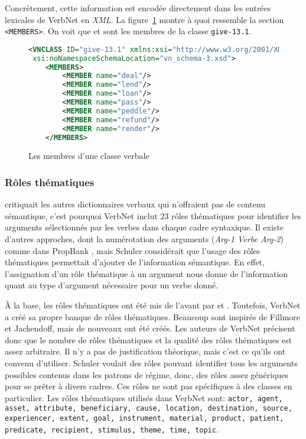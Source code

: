 Concrètement, cette information est encodée directement dans les entrées lexicales de VerbNet en \emph{XML}. La figure~\ref{membre} montre à quoi ressemble la section \texttt{<MEMBERS>}. On voit que  et  sont les membres de la classe \texttt{give-13.1}.

\begin{figure}[htb]
  \caption{Les membres d'une classe verbale}
	\label{membre}
\begin{lstlisting}[language=XML]
<VNCLASS ID="give-13.1" xmlns:xsi="http://www.w3.org/2001/XMLSchema-instance"
 xsi:noNamespaceSchemaLocation="vn_schema-3.xsd">
    <MEMBERS>
        <MEMBER name="deal"/>
        <MEMBER name="lend"/>
        <MEMBER name="loan"/>
        <MEMBER name="pass"/>
        <MEMBER name="peddle"/>
        <MEMBER name="refund"/>
        <MEMBER name="render"/>
    </MEMBERS>
\end{lstlisting}
\end{figure}

\subsubsection{Rôles thématiques}
\cite{SchulerVerbnetBroadcoverageComprehensive2005} critiquait les autres dictionnaires verbaux qui n'offraient pas de contenu sémantique, c'est pourquoi VerbNet inclut 23 rôles thématiques pour identifier les arguments sélectionnés par les verbes dans chaque cadre syntaxique. Il existe d'autres approches, dont la numérotation des arguments (\emph{Arg-1 Verbe Arg-2}) comme dans PropBank \citep{PalmerPropositionBankAnnotated2005}, mais Schuler considérait que l'usage des rôles thématiques permettait d'ajouter de l'information sémantique. En effet, l'assignation d'un rôle thématique à un argument nous donne de l'information quant au type d'argument nécessaire pour un verbe donné.

À la base, les rôles thématiques ont été mis de l'avant par \cite{FillmoreCaseCase1968} et \cite{Jackendoff1972-JACSII-2}. Toutefois, VerbNet a créé sa propre banque de rôles thématiques. Beaucoup sont inspirés de Fillmore et Jackendoff, mais de nouveaux ont été créés. Les auteurs de VerbNet précisent donc que le nombre de rôles thématiques et la qualité des rôles thématiques est assez arbitraire. Il n'y a pas de justification théorique, mais c'est ce qu'ils ont convenu d'utiliser. Schuler voulait des rôles pouvant identifier tous les arguments possibles contenus dans les patrons de régime, donc, des rôles assez génériques pour se prêter à divers cadres. Ces rôles ne sont pas spécifiques à des classes en particulier.
Les rôles thématiques utilisés dans VerbNet sont: \texttt{actor, agent, asset, attribute, beneficiary, cause, location, destination, source, experiencer, extent, goal, instrument, material, product, patient, predicate, recipient, stimulus, theme, time, topic}.

